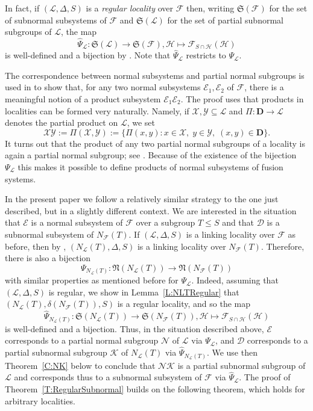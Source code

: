 \documentclass[reqno,11pt]{amsart}
\numberwithin{equation}{section}
\theoremstyle{definition}
\newcommand{\F}{\mathcal{F}}
\newcommand{\E}{\mathcal{E}}
\renewcommand{\L}{\mathcal{L}}
\newcommand{\N}{\mathcal{N}}
\newcommand{\K}{\mathcal{K}}
\newcommand{\D}{\mathbf{D}}
\renewcommand{\H}{\mathcal{H}}
\newcommand{\fN}{\mathfrak{N}}
\newcommand{\X}{{\mathcal{X}}}
\newcommand{\Y}{{\mathcal{Y}}}
\newcommand{\mD}{\mathcal{D}}
\newcommand{\fS}{\mathfrak{S}}
\begin{document}
\smallskip

In fact, if $(\L,\Delta,S)$ is a \emph{regular locality} over $\F$ then, writing $\fS(\F)$ for the set of subnormal subsystems of $\F$ and $\fS(\L)$ for the set of partial subnormal subgroups of $\L$, the map
\[\hat{\Psi}_\L\colon \fS(\L)\rightarrow \fS(\F),\H\mapsto \F_{S\cap\H}(\H)\]
is well-defined and a bijection by \cite[Theorem~F]{Chermak/Henke}. Note that $\hat{\Psi}_\L$ restricts to $\Psi_\L$.

\smallskip

The correspondence between normal subsystems and partial normal subgroups is used in \cite[Theorem~C]{Chermak/Henke} to show that, for any two normal subsystems $\E_1,\E_2$ of $\F$, there is a meaningful notion of a product subsystem $\E_1\E_2$. The proof uses that products in localities can be formed very naturally. Namely, if $\X,\Y\subseteq\L$ and $\Pi\colon\D\rightarrow\L$ denotes the partial product on $\L$, we set
\[\X\Y:=\Pi(\X,\Y):=\{\Pi(x,y)\colon x\in\X,\;y\in\Y,\;(x,y)\in\D\}.\]
It turns out that the product of any two partial normal subgroups of a locality is again a partial normal subgroup; see \cite{Henke:2015a}. Because of the existence of the bijection $\Psi_\L$ this makes it possible to define products of normal subsystems of fusion systems.

\smallskip

In the present paper we follow a relatively similar strategy to the one just described, but in a slightly different context. We are interested in the situation that $\E$ is a normal subsystem of $\F$ over a subgroup $T\leq S$ and that $\mD$ is a subnormal subsystem of $N_\F(T)$. If $(\L,\Delta,S)$ is a linking locality over $\F$ as before, then by \cite[Lemma~3.35(b)]{Henke:Regular}, $(N_\L(T),\Delta,S)$ is a linking locality over $N_\F(T)$. Therefore, there is also a bijection
\[\Psi_{N_\L(T)}\colon \fN(N_\L(T))\rightarrow \fN(N_\F(T))\]
with similar properties as mentioned before for $\Psi_\L$. Indeed, assuming that $(\L,\Delta,S)$ is regular, we show in Lemma~\ref{L:NLTRegular} that $(N_\L(T),\delta(N_\F(T)),S)$ is a regular locality, and so the map
\[\hat{\Psi}_{N_\L(T)}\colon \fS(N_\L(T))\rightarrow \fS(N_\F(T)),\H\mapsto \F_{S\cap\H}(\H)\]
is well-defined and a bijection. Thus, in the situation described above, $\E$ corresponds to a partial normal subgroup $\N$ of $\L$ via $\Psi_\L$, and $\mD$ corresponds to a partial subnormal subgroup $\K$ of $N_\L(T)$ via $\hat{\Psi}_{N_\L(T)}$. We use then Theorem~\ref{C:NK} below to conclude that $\N\K$ is a partial subnormal subgroup of $\L$ and corresponds thus to a subnormal subsystem of $\F$ via $\hat{\Psi}_\L$. The proof of Theorem~\ref{T:RegularSubnormal} builds on the following theorem, which holds for arbitrary localities.
\end{document}
